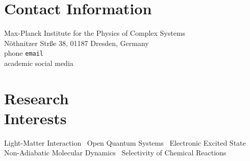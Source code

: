 \section{\sc Contact Information}

Max-Planck Institute for the Physics of Complex Systems \\
N\"othnitzer Str\ss e 38, 01187 Dresden, Germany \\
 phone \hfill \texttt{email} \\
{\footnotesize academic social media}


\section{\sc Research\\ Interests}
Light-Matter Interaction \textbar\ 
Open Quantum Systems \textbar\ 
Electronic Excited State\textbar\ \\ 
Non-Adiabatic Molecular Dynamics \textbar\ 
Selectivity of Chemical Reactions \textbar\ 
\endinput